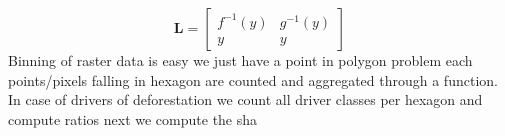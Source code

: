 		\begin{equation}
		\label{eq:line}
			\mathbf{L} =
			\begin{bmatrix}
				f^{-1}(y) & g^{-1}(y) \\
				y & y
			\end{bmatrix}
		\end{equation}
		Binning of raster data is easy we just have a point in polygon problem each points/pixels falling in hexagon are counted and aggregated through a function. In case of drivers of deforestation we count all driver classes per hexagon and compute ratios next we compute the sha 
